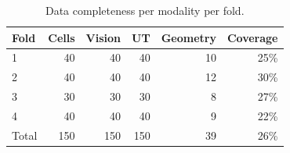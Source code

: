 \begin{table}[htbp]
\centering
\caption{Data completeness per modality per fold.}
\label{tab:completeness}
\begin{tabular}{@{}lrrrrr@{}}
\toprule
Fold & Cells & Vision & UT & Geometry & Coverage \\
\midrule
1 & 40 & 40 & 40 & 10 & 25\% \\
2 & 40 & 40 & 40 & 12 & 30\% \\
3 & 30 & 30 & 30 & 8 & 27\% \\
4 & 40 & 40 & 40 & 9 & 22\% \\
\midrule
Total & 150 & 150 & 150 & 39 & 26\% \\
\bottomrule
\end{tabular}
\end{table}
